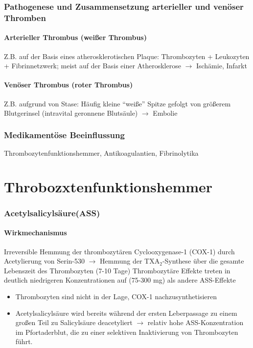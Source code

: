 \documentclass[10pt,a4paper]{report}
\begin{document}
\subsubsection{Pathogenese und Zusammensetzung arterieller und venöser Thromben} %
\label{ssub:pathogenese_und_zusammensetzung_arterieller_und_ven_ser_thromben}
\paragraph{Arterieller Thrombus (weißer Thrombus)} %
\label{par:arterieller_thrombus_wei_er_thrombus_}
Z.B. auf der Basis eines atherosklerotischen Plaque: Thrombozyten + Leukozyten + Fibrinnetzwerk; meist auf der Basis einer Atherosklerose $\rightarrow$ Ischämie, Infarkt
\paragraph{Venöser Thrombus (roter Thrombus)} %
\label{par:ven_ser_thrombus_roter_thrombus_}
Z.B. aufgrund von Stase: Häufig kleine “weiße” Spitze gefolgt von größerem Blutgerinsel (intravital geronnene Blutsäule) $\rightarrow$ Embolie
\subsubsection{Medikamentöse Beeinflussung} %
\label{ssub:medikament_se_beeinflussung}
Thrombozytenfunktionshemmer, Antikoagulantien, Fibrinolytika
\section{Throbozxtenfunktionshemmer} %
\label{sec:throbozxtenfunktionshemmer}
\subsubsection{Acetylsalicylsäure(ASS)} %
\label{ssub:acetylsalicyls_ure}
\paragraph{Wirkmechanismus} %
\label{par:wirkmechan}
Irreversible Hemmung der thrombozytären Cyclooxygenase-1 (COX-1) durch Acetylierung von Serin-530 $\rightarrow$ Hemmung der TXA$_2$-Synthese über die gesamte Lebenszeit des Thrombozyten (7-10 Tage)
Thrombozytäre Effekte treten in deutlich niedrigeren Konzentrationen auf (75-300 mg) als andere ASS-Effekte
\begin{itemize}
	\item Thrombozyten sind nicht in der Lage, 
	COX-1 nachzusynthetisieren
	\item Acetylsalicylsäure wird bereits während der ersten Leberpassage zu einem großen Teil zu Salicylsäure deacetyliert $\rightarrow$ relativ hohe ASS-Konzentration im Pfortaderblut, die zu einer selektiven Inaktivierung von Thrombozyten führt.
\end{itemize}
\end{document}

